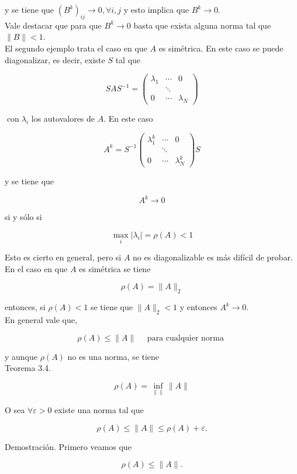 \documentclass[10pt]{article}
\begin{document}
y se tiene que $\left(B^{k}\right)_{i j} \rightarrow 0, \forall i, j$ y esto implica que $B^{k} \rightarrow 0$.\\
Vale destacar que para que $B^{k} \rightarrow 0$ basta que exista alguna norma tal que $\|B\|<1$.\\
El segundo ejemplo trata el caso en que $A$ es simétrica. En este caso se puede diagonalizar, es decir, existe $S$ tal que

$$
S A S^{-1}=\left(\begin{array}{ccc}
\lambda_{1} & \cdots & 0 \\
& \ddots & \\
0 & \cdots & \lambda_{N}
\end{array}\right)
$$

$\operatorname{con} \lambda_{i}$ los autovalores de $A$. En este caso

$$
A^{k}=S^{-1}\left(\begin{array}{ccc}
\lambda_{1}^{k} & \cdots & 0 \\
& \ddots & \\
0 & \cdots & \lambda_{N}^{k}
\end{array}\right) S
$$

y se tiene que

$$
A^{k} \rightarrow 0
$$

si y sólo si

$$
\max _{i}\left|\lambda_{i}\right|=\rho(A)<1
$$

Esto es cierto en general, pero si $A$ no es diagonalizable es más difícil de probar.\\
En el caso en que $A$ es simétrica se tiene

$$
\rho(A)=\|A\|_{2}
$$

entonces, si $\rho(A)<1$ se tiene que $\|A\|_{2}<1$ y entonces $A^{k} \rightarrow 0$.\\
En general vale que,

$$
\rho(A) \leq\|A\| \quad \text { para cualquier norma }
$$

y aunque $\rho(A)$ no es una norma, se tiene\\
Teorema 3.4.

$$
\rho(A)=\inf _{\| \|}\|A\|
$$

O sea $\forall \varepsilon>0$ existe una norma tal que

$$
\rho(A) \leq\|A\| \leq \rho(A)+\varepsilon .
$$

Demostración. Primero veamos que

$$
\rho(A) \leq\|A\| .
$$
\end{document}
